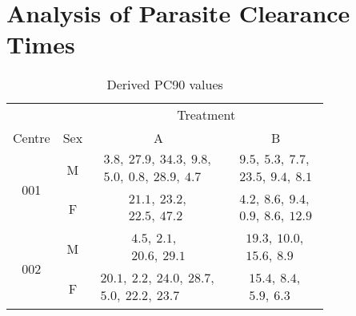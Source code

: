 \chapter{Analysis of Parasite Clearance Times}
\begin{table}[h]
\centering
\caption{Derived PC90 values}\label{pc90}
\begin{tabular}{|cc|c|c|}
\hline
&&\multicolumn{2}{c|}{Treatment}\\
Centre&Sex&A&B\\\hline
\multirow{2}{*}{001}&M&$\begin{array}{c}3.8,\ 27.9,\ 34.3,\  9.8,\\5.0,\  0.8,\ 28.9,\  4.7\end{array}$&$\begin{array}{c}9.5,\  5.3,\  7.7,\\23.5,\  9.4,\  8.1\end{array}$\\\cline{2-4}
&F&$\begin{array}{c}21.1,\ 23.2,\\22.5,\ 47.2\end{array}$&$\begin{array}{c}4.2,\ 8.6 ,\ 9.4,\\0.9,\ 8.6,\ 12.9\end{array}$\\\hline
\multirow{2}{*}{002}&M&$\begin{array}{c}4.5,\ 2.1,\\20.6,\ 29.1\end{array}$&$\begin{array}{c}19.3,\ 10.0,\\15.6,\ 8.9\end{array}$\\\cline{2-4}
&F&$\begin{array}{c}20.1,\ 2.2,\ 24.0,\ 28.7,\\5.0,\ 22.2,\ 23.7\end{array}$&$\begin{array}{c}15.4,\  8.4,\\5.9,\ 6.3\end{array}$\\\hline
\end{tabular}
\end{table}
